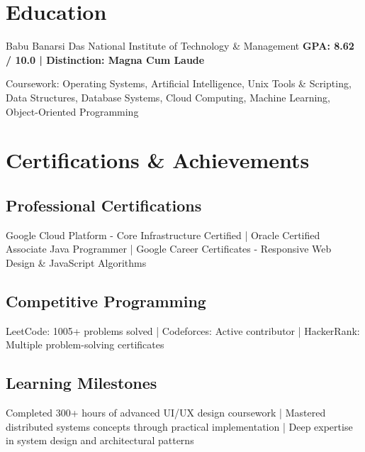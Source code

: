 \documentclass[]{hanisntsolo-resume}
\begin{document}
\sectionsep


\section{Education}

Babu Banarsi Das National Institute of Technology \& Management
\textbf{GPA: 8.62 / 10.0 | Distinction: Magna Cum Laude}

Coursework: Operating Systems, Artificial Intelligence, Unix Tools \& Scripting, Data Structures, Database Systems, Cloud Computing, Machine Learning, Object-Oriented Programming

\sectionsep


\sectionsep


\section{Certifications \& Achievements}

\subsection{Professional Certifications}
Google Cloud Platform - Core Infrastructure Certified | Oracle Certified Associate Java Programmer | Google Career Certificates - Responsive Web Design \& JavaScript Algorithms

\subsection{Competitive Programming}
LeetCode: 1005+ problems solved | Codeforces: Active contributor | HackerRank: Multiple problem-solving certificates

\subsection{Learning Milestones}
Completed 300+ hours of advanced UI/UX design coursework | Mastered distributed systems concepts through practical implementation | Deep expertise in system design and architectural patterns
\end{document}
